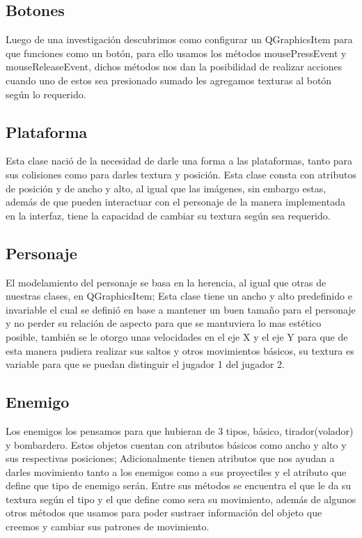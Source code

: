 \documentclass{article}
\begin{document}
    \subsection{Botones}
    Luego de una investigación descubrimos como configurar un QGraphicsItem para que funciones como un botón, para ello usamos los métodos mousePressEvent y mouseReleaseEvent, dichos métodos nos dan la posibilidad de realizar acciones cuando uno de estos sea presionado sumado les agregamos texturas al botón según lo requerido. 
    
\newpage
    
    \subsection{Plataforma}
    Esta clase nació de la necesidad de darle una forma a las plataformas, tanto para sus colisiones como para darles textura y posición. Esta clase consta con atributos de posición y de ancho y alto, al igual que las imágenes, sin embargo estas, además de que pueden interactuar con el personaje de la manera implementada en la interfaz, tiene la capacidad de cambiar su textura según sea requerido.
    
    \subsection{Personaje}
    El modelamiento del personaje se basa en la herencia, al igual que otras de nuestras clases, en QGraphicsItem; Esta clase tiene un ancho y alto predefinido e invariable el cual se definió en base a mantener un buen tamaño para el personaje y no perder su relación de aspecto para que se mantuviera lo mas estético posible, también se le otorgo unas velocidades en el eje X y el eje Y para que de esta manera pudiera realizar sus saltos y otros movimientos básicos, su textura es variable para que se puedan distinguir el jugador 1 del jugador 2.
    
    \subsection{Enemigo}
    Los enemigos los pensamos para que hubieran de 3 tipos, básico, tirador(volador) y bombardero. Estos objetos cuentan con atributos básicos como ancho y alto y sus respectivas posiciones; Adicionalmente tienen atributos que nos ayudan a darles movimiento tanto a los enemigos como a sus proyectiles y el atributo que define que tipo de enemigo serán. Entre sus métodos se encuentra el que le da su textura según el tipo y el que define como sera su movimiento, además de algunos otros métodos que usamos para poder sustraer información del objeto que creemos y cambiar sus patrones de movimiento.
    
\end{document}
